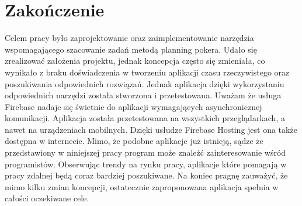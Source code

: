 \chapter*{Zakończenie}

Celem pracy było zaprojektowanie oraz zaimplementowanie narzędzia wspomagającego szacowanie zadań metodą planning pokera.
Udało się zrealizować założenia projektu, jednak koncepcja często się zmieniała,
co wynikało z braku doświadczenia w tworzeniu aplikacji czasu rzeczywistego oraz poszukiwania odpowiednich rozwiązań.
Jednak aplikacja dzięki wykorzystaniu odpowiednich narzędzi została stworzona i przetestowana.
Uważam że usługa Firebase nadaje się świetnie do aplikacji wymagających asynchronicznej komunikacji.
Aplikacja została przetestowana na wszystkich przeglądarkach, a nawet na urządzeniach mobilnych.
Dzięki usłudze Firebase Hosting jest ona także dostępna w internecie.
Mimo, że podobne aplikacje już istnieją,
sądze że przedstawiony w niniejszej pracy program może znaleźć zainteresowanie wśród programistów.
Obserwując trendy na rynku pracy, aplikacje które pomagają w pracy zdalnej będą coraz bardziej poszukiwane.
Na koniec pragnę zauważyć, że mimo kilku zmian koncepcji, ostatecznie zaproponowana aplikacja spełnia w całości oczekiwane cele.